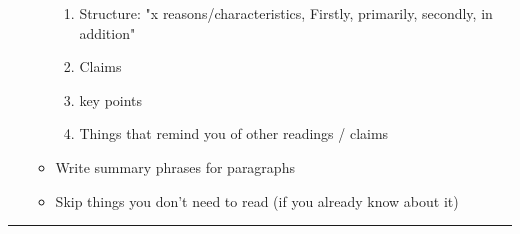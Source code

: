 \documentclass[letterpaper]{article}
\begin{document}
\begin{itemize}
\begin{itemize}
\begin{enumerate}
\item Structure: "x reasons/characteristics, Firstly, primarily,
secondly, in addition"
\item Claims
\item key points
\item Things that remind you of other readings / claims
\end{enumerate}

\item Write summary phrases for paragraphs
\item Skip things you don't need to read (if you already know about it)
\end{itemize}
\end{itemize}

\noindent\rule{\textwidth}{0.5pt}
\end{document}
